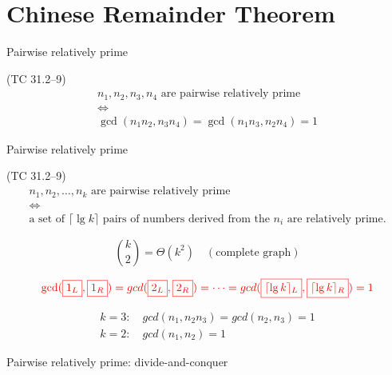 \section{Chinese Remainder Theorem}

\begin{frame}{Pairwise relatively prime}
  \begin{exampleblock}{(TC 31.2--9)}
	\begin{gather*}
	  n_1, n_2, n_3, n_4 \text{ are pairwise relatively prime} \\
	  \iff \\
	  \gcd(n_1n_2, n_3n_4) = \gcd(n_1n_3, n_2n_4) = 1
	\end{gather*}
  \end{exampleblock}
\end{frame}
\begin{frame}{Pairwise relatively prime}
  \begin{exampleblock}{(TC 31.2--9)}
	\begin{gather*}
	  n_1, n_2, \dots, n_k \text{ are pairwise relatively prime} \\
	  \iff \\
	  \text{a set of } \lceil \lg k \rceil \text{ pairs of numbers derived from the } n_i \text{ are relatively prime}.
	\end{gather*}
  \end{exampleblock}

  \pause
  \[
	\binom{k}{2} = \Theta(k^2)	\quad (\text{complete graph})
  \]

  \pause
  \[
	\textcolor{red}{\gcd(\fbox{$1_L$}, \fbox{$1_R$}) 
	= gcd(\fbox{$2_L$}, \fbox{$2_R$}) 
	= \cdots 
	= gcd(\fbox{$\lceil \lg k \rceil_L$}, \fbox{$\lceil \lg k \rceil_R$}) = 1}
  \]

  \pause
  \begin{gather*}
	k = 3: \quad gcd(n_1, n_2n_3) = gcd(n_2, n_3) = 1 \\
	k = 2: \quad gcd(n_1, n_2) = 1
  \end{gather*}
\end{frame}
\begin{frame}{Pairwise relatively prime: divide-and-conquer}
  \begin{center}
	
  \end{center}

\end{frame}
